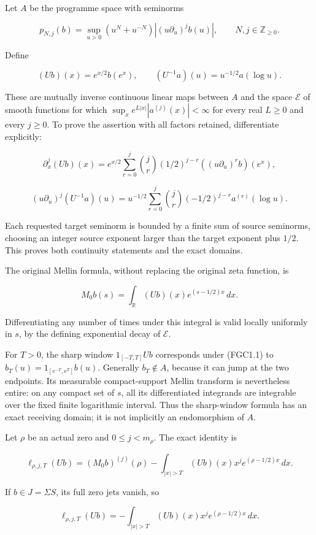 Let \(A\) be the programme space with seminorms

\[
 p_{N,j}(b)=\sup_{u>0}(u^N+u^{-N})|(u\partial_u)^j b(u)|,
 \qquad N,j\in\mathbb Z_{\geq0}.
\]

Define

\[
 (Ub)(x)=e^{x/2}b(e^x),\qquad
 (U^{-1}a)(u)=u^{-1/2}a(\log u).
\tag{FGC1.1}
\]

These are mutually inverse continuous linear maps between \(A\) and the
space \(\mathcal E\) of smooth functions for which
\(\sup_x e^{L|x|}|a^{(j)}(x)|<\infty\) for every real \(L\geq0\) and
every \(j\geq0\). To prove the assertion with all factors retained,
differentiate explicitly:

\[
 \partial_x^j(Ub)(x)
 =e^{x/2}\sum_{r=0}^j\binom jr(1/2)^{j-r}
 ((u\partial_u)^r b)(e^x),
\]

\[
 (u\partial_u)^j(U^{-1}a)(u)
 =u^{-1/2}\sum_{r=0}^j\binom jr(-1/2)^{j-r}a^{(r)}(\log u).
\tag{FGC1.2}
\]

Each requested target seminorm is bounded by a finite sum of source
seminorms, choosing an integer source exponent larger than the target
exponent plus \(1/2\). This proves both continuity statements and the
exact domains.

The original Mellin formula, without replacing the original zeta
function, is

\[
 M_0b(s)=\int_{\mathbb R}(Ub)(x)e^{(s-1/2)x}\,dx.
\tag{FGC1.3}
\]

Differentiating any number of times under this integral is valid locally
uniformly in \(s\), by the defining exponential decay of \(\mathcal E\).

For \(T>0\), the sharp window \(1_{[-T,T]}Ub\) corresponds under
(FGC1.1) to \(b_T(u)=1_{[e^{-T},e^T]}b(u)\). Generally \(b_T\notin A\),
because it can jump at the two endpoints. Its measurable compact-support
Mellin transform is nevertheless entire: on any compact set of \(s\),
all its differentiated integrands are integrable over the fixed finite
logarithmic interval. Thus the sharp-window formula has an exact
receiving domain; it is not implicitly an endomorphism of \(A\).

Let \(\rho\) be an actual zero and \(0\leq j<m_\rho\). The exact
identity is

\[
 \ell_{\rho,j,T}(Ub)
 =(M_0b)^{(j)}(\rho)
 -\int_{|x|>T}(Ub)(x)x^j e^{(\rho-1/2)x}\,dx.
\tag{FGC1.4}
\]

If \(b\in J=\Sigma S\), its full zero jets vanish, so

\[
 \ell_{\rho,j,T}(Ub)
 =-\int_{|x|>T}(Ub)(x)x^j e^{(\rho-1/2)x}\,dx.
\tag{FGC1.5}
\]

